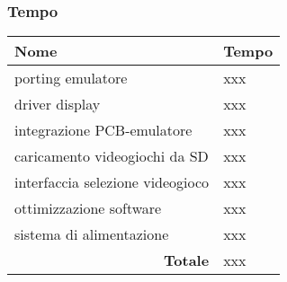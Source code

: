 \documentclass[12pt]{article}
\begin{document}
\subsubsection{Tempo}
\begin{center}
\begin{table}[h]
\begin{tabular}{|l|l|}
\hline
\textbf{Nome}                         & \textbf{Tempo} \\ \hline
porting emulatore                     & xxx            \\ \hline
driver display                        & xxx            \\ \hline
integrazione PCB-emulatore            & xxx            \\ \hline
caricamento videogiochi da SD         & xxx            \\ \hline
interfaccia selezione videogioco      & xxx            \\ \hline
ottimizzazione software               & xxx            \\ \hline
sistema di alimentazione              & xxx            \\ \hline
\multicolumn{1}{|r|}{\textbf{Totale}} & xxx            \\ \hline
\end{tabular}
\end{table}

\end{center}
\end{document}
